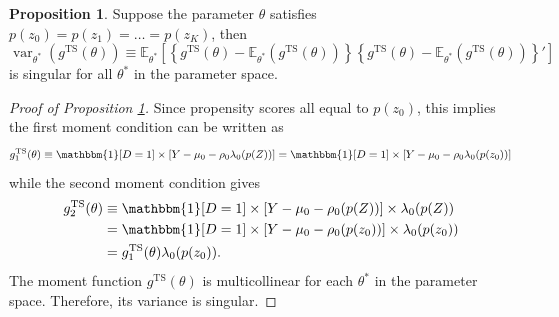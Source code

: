 \documentclass[11pt]{article}
\theoremstyle{definition}
\newtheorem{proposition}{Proposition}[section]
\DeclareMathOperator{\var}{var}
\newcommand{\Exp}{\ensuremath{\mathbb{E}}} %
\newcommand{\0}{\ensuremath{\mathbf{0}}}
\newcommand{\indicator}{\ensuremath{\mathbbm{1}}}
\begin{document}
\begin{bibunit}
\begin{proposition}
\label{prop:singular_Var}
Suppose the parameter $\theta$ satisfies $p(z_0) = p(z_1) = \ldots = p(z_K)$, then
\[
    \var_{\theta^*}(g^{\text{TS}}(\theta)) \equiv \Exp_{\theta^*}\left[\left\{g^{\text{TS}}(\theta) - \Exp_{\theta^*}(g^{\text{TS}}(\theta))\right\}\left\{g^{\text{TS}}(\theta) - \Exp_{\theta^*}(g^{\text{TS}}(\theta))\right\}'\right]
\]
is singular for all $\theta^*$ in the parameter space.
\end{proposition}
\begin{proof}[Proof of Proposition \ref{prop:singular_Var}]
    Since propensity scores all equal to $p(z_0)$, this implies the first moment condition can be written as
    \[
        g_1^{\text{TS}}(\theta) \equiv \indicator[D=1]\times [Y - \mu_0 - \rho_0 \lambda_0(p(Z))] =  \indicator[D=1]\times [Y - \mu_0 - \rho_0\lambda_0(p(z_0))]
    \]
    while the second moment condition gives
    \begin{align*}
        g_2^{\text{TS}}(\theta) 
        &\equiv  \indicator[D=1]\times [Y-\mu_0-\rho_0(p(Z))] \times \lambda_0(p(Z)) \\
        &= \indicator[D=1]\times [Y-\mu_0-\rho_0(p(z_0))] \times \lambda_0(p(z_0)) \\
        &= g_1^{\text{TS}}(\theta) \lambda_0(p(z_0)).
    \end{align*}
    The moment function $g^{\text{TS}}(\theta)$ is multicollinear for each $\theta^*$ in the parameter space. Therefore, its variance is singular.
\end{proof}


\end{bibunit}
\end{document}
